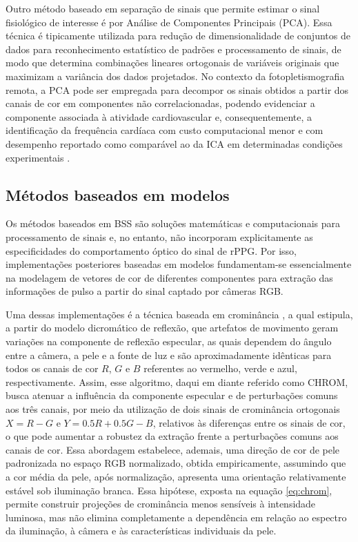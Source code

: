Outro método baseado em separação de sinais que permite estimar o sinal fisiológico de interesse é por Análise de Componentes Principais (PCA). Essa técnica é tipicamente utilizada para redução de dimensionalidade de conjuntos de dados para reconhecimento estatístico de padrões e processamento de sinais, de modo que determina combinações lineares ortogonais de variáveis originais que maximizam a variância dos dados projetados. No contexto da fotopletismografia remota, a PCA pode ser empregada para decompor os sinais obtidos a partir dos canais de cor em componentes não correlacionadas, podendo evidenciar a componente associada à atividade cardiovascular e, consequentemente, a identificação da frequência cardíaca com custo computacional menor e com desempenho reportado como comparável ao da ICA em determinadas condições experimentais \cite{lewandowska2012measuring}.

\subsection{Métodos baseados em modelos}

Os métodos baseados em BSS são soluções matemáticas e computacionais para processamento de sinais e, no entanto, não incorporam explicitamente as especificidades do comportamento óptico do sinal de rPPG. Por isso, implementações posteriores baseadas em modelos fundamentam-se essencialmente na modelagem de vetores de cor de diferentes componentes para extração das informações de pulso a partir do sinal captado por câmeras RGB. 

Uma dessas implementações é a técnica baseada em crominância \cite{de2013robust}, a qual estipula, a partir do modelo dicromático de reflexão, que artefatos de movimento geram variações na componente de reflexão especular, as quais dependem do ângulo entre a câmera, a pele e a fonte de luz e são aproximadamente idênticas para todos os canais de cor \(R\), \(G\) e \(B\) referentes ao vermelho, verde e azul, respectivamente. Assim, esse algoritmo, daqui em diante referido como CHROM, busca atenuar a influência da componente especular e de perturbações comuns aos três canais, por meio da utilização de dois sinais de crominância ortogonais \(X = R -G\) e \(Y = 0.5 R + 0.5 G - B\), relativos às diferenças entre os sinais de cor, o que pode aumentar a robustez da extração frente a perturbações comuns aos canais de cor. Essa abordagem estabelece, ademais, uma direção de cor de pele padronizada no espaço RGB normalizado, obtida empiricamente, assumindo que a cor média da pele, após normalização, apresenta uma orientação relativamente estável sob iluminação branca. Essa hipótese, exposta na equação \ref{eq:chrom}, permite construir projeções de crominância menos sensíveis à intensidade luminosa, mas não elimina completamente a dependência em relação ao espectro da iluminação, à câmera e às características individuais da pele.

